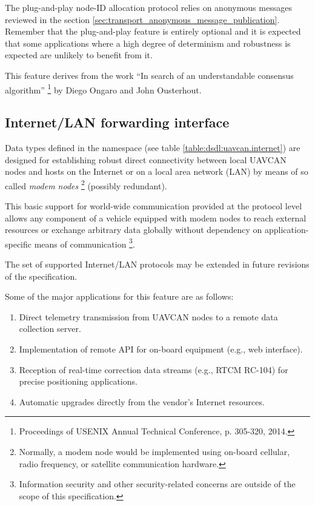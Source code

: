 The plug-and-play node-ID allocation protocol relies on anonymous messages reviewed in the section
\ref{sec:transport_anonymous_message_publication}.
Remember that the plug-and-play feature is entirely optional and it is expected that some applications where a
high degree of determinism and robustness is expected are unlikely to benefit from it.

This feature derives from the work
``In search of an understandable consensus algorithm''%
\footnote{Proceedings of USENIX Annual Technical Conference, p. 305-320, 2014.}
by Diego Ongaro and John Ousterhout.


\subsection{Internet/LAN forwarding interface}

Data types defined in the namespace  (see table \ref{table:dsdl:uavcan.internet})
are designed for establishing robust direct connectivity between local UAVCAN nodes and hosts on the Internet
or on a local area network (LAN) by means of so called \emph{modem nodes}%
\footnote{Normally, a modem node would be implemented using on-board cellular, radio frequency,
or satellite communication hardware.}
(possibly redundant).

This basic support for world-wide communication provided at the protocol level allows any component
of a vehicle equipped with modem nodes to reach external resources or exchange arbitrary data globally
without dependency on application-specific means of communication%
\footnote{Information security and other security-related concerns are outside of the scope of this specification.}.

The set of supported Internet/LAN protocols may be extended in future revisions of the specification.

\begin{remark}
    Some of the major applications for this feature are as follows:
    \begin{enumerate}
        \item Direct telemetry transmission from UAVCAN nodes to a remote data collection server.
        \item Implementation of remote API for on-board equipment (e.g., web interface).
        \item Reception of real-time correction data streams (e.g., RTCM RC-104)
              for precise positioning applications.
        \item Automatic upgrades directly from the vendor's Internet resources.
    \end{enumerate}
\end{remark}

